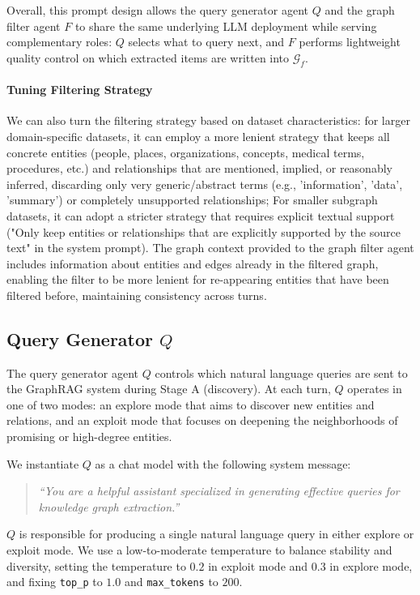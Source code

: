 %
Overall, this prompt design allows the query generator agent $Q$ and the graph filter agent $F$ to share the same underlying LLM deployment while serving complementary roles: $Q$ selects what to query next, and $F$ performs lightweight quality control on which extracted items are written into $\mathcal{G}_f$.


\paragraph{Tuning Filtering Strategy}
\label{app:tune}
We can also turn the filtering strategy based on dataset characteristics: for larger domain-specific datasets, it can employ a more lenient strategy that keeps all concrete entities (people, places, organizations, concepts, medical terms, procedures, etc.) and relationships that are mentioned, implied, or reasonably inferred, discarding only very generic/abstract terms (e.g., 'information', 'data', 'summary') or completely unsupported relationships;
For smaller subgraph datasets, it can adopt a stricter strategy that requires explicit textual support ("Only keep entities or relationships that are explicitly supported by the source text" in the system prompt). The graph context provided to the graph filter agent includes information about entities and edges already in the filtered graph, enabling the filter to be more lenient for re-appearing entities that have been filtered before, maintaining consistency across turns.



\subsection{Query Generator $Q$}
\label{app:query_generator}
The query generator agent $Q$ controls which natural language queries are sent to the GraphRAG system during Stage A (discovery). At each turn, $Q$ operates in one of two modes: an \textsf{explore} mode that aims to discover new entities
and relations, and an \textsf{exploit} mode that focuses on deepening the neighborhoods of promising or high-degree entities.

We instantiate $Q$ as a chat model with the following system message:
\begin{quote}
\textit{``You are a helpful assistant specialized in generating effective queries for knowledge graph extraction.''}
\end{quote}
$Q$ is responsible for producing a single natural language query in either explore or exploit mode. We use a low-to-moderate temperature to balance stability and diversity, setting the temperature to $0.2$ in exploit mode and
$0.3$ in \textsf{explore} mode, and fixing \texttt{top\_p} to $1.0$ and
\texttt{max\_tokens} to $200$.

